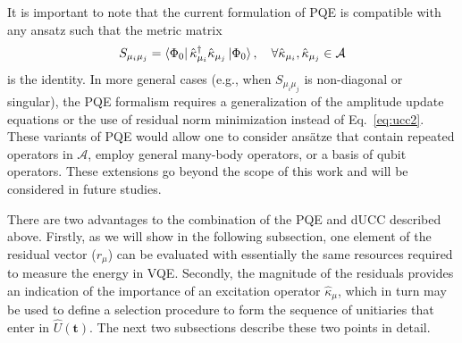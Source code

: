 \documentclass[aps,prx, reprint]{revtex4-2}
\newcommand*{\qucc}{dUCC\xspace}
\begin{document}
It is important to note that the current formulation of PQE is compatible with any ansatz such that the metric matrix
\begin{equation}
S_{\mu_i \mu_j}   = \bra{\Phi_0} \hat{\kappa}^\dagger_{\mu_i}  \hat{\kappa}_{\mu_j} \ket{\Phi_0}, \quad \forall \hat{\kappa}_{\mu_i}, \hat{\kappa}_{\mu_j} \in \mathcal{A}
\end{equation}
is the identity.
In more general cases (e.g., when $S_{\mu_i \mu_j}$ is non-diagonal or singular), the PQE formalism requires a generalization of the amplitude update equations or the use of residual norm minimization instead of Eq.~\eqref{eq:ucc2}.
These variants of PQE would allow one to consider ans\"{a}tze that contain repeated operators in $\mathcal{A}$, employ general many-body operators,  or a basis of qubit operators.
These extensions go beyond the scope of this work and will be considered in future studies.

There are two advantages to the combination of the PQE and \qucc described  above. Firstly, as we will show in the following subsection, one element of the residual vector ($r_\mu$) can be evaluated with essentially the same resources  required to measure the energy in VQE.
Secondly, the magnitude of the residuals provides an indication of the importance of an excitation operator $\hat{\kappa}_\mu$, which in turn may be used to define a selection procedure to form the sequence of unitiaries that enter in $\hat{U}(\mathbf{t})$.
The next two subsections describe these two points in detail.
\end{document}
